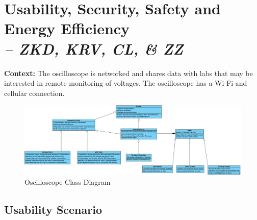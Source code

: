 \chapter{Usability, Security, Safety and Energy Efficiency \\
\small{\textit{-- ZKD, KRV, CL, \& ZZ}}
\label{Chapter::Usability}}

\textbf{Context:} The oscilloscope is networked and shares data with labs that may be interested in remote monitoring of voltages.  The oscilloscope has a Wi-Fi and cellular connection.

\begin{figure}[h]
    \centering
    \includegraphics[scale=0.4]{Book-SSW565/png/Scope-Function-Generator-2.png}
    \caption{\label{Figure::Oscilloscope Class Diagram}Oscilloscope Class Diagram}
\end{figure}

\section{Usability Scenario}

